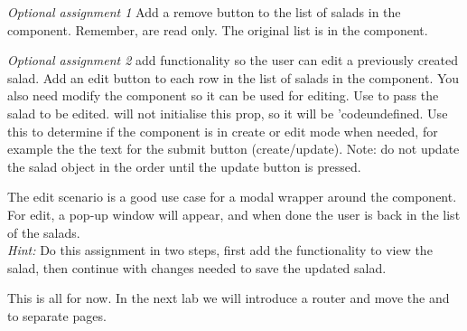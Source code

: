 \documentclass[fleqn, article, a4paper]{memoir}
\begin{document}
\begin{Assignments}
\item \emph{Optional assignment 1} Add a remove button to the list of salads in the  component. Remember,  are read only. The original list is in the  component.

\item \emph{Optional assignment 2}  add functionality so the user can edit a previously created salad. Add an edit button to each row in the list of salads in the  component. You also need modify the  component so it can be used for editing. Use  to pass the salad to be edited.  will not initialise this prop, so it will be 'code{undefined}. Use this to determine if the  component is in create or edit mode when needed, for example the the text for the submit button (create/update). Note: do not update the salad object in the order until the update button is pressed.

The edit scenario is a good use case for a modal wrapper around the  component. For edit, a pop-up window will appear, and when done the user is back in the list of the salads.
\\ \emph{Hint: } Do this assignment in two steps, first add the functionality to view the salad, then continue with changes needed to save the updated salad.

\item This is all for now. In the next lab we will introduce a router and move the  and  to separate pages.

\end{Assignments}


\end{document}
